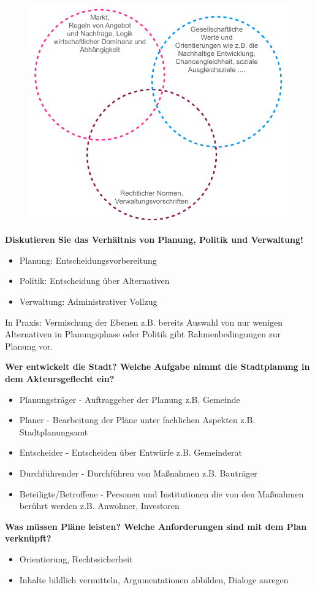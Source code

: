 \documentclass[]{article}
\newenvironment{question}{\vspace{8mm}\noindent\bfseries}{\\}
\begin{document}
\begin{figure}[h!]
	\centering
	\includegraphics[width=0.5\linewidth]{images/planung_wirkgeflecht}
	\label{fig:planungwirkgeflecht}
\end{figure}


\begin{question}
	Diskutieren Sie das Verhältnis von Planung, Politik und Verwaltung!
\end{question}
\begin{itemize}
	\item Planung: Entscheidungsvorbereitung
	\item Politik: Entscheidung über Alternativen
	\item Verwaltung: Administrativer Vollzug
\end{itemize}

In Praxis: Vermischung der Ebenen z.B. bereits Auswahl von nur wenigen Alternativen in Planungsphase oder Politik gibt Rahmenbedingungen zur Planung vor.


\begin{question}
	Wer entwickelt die Stadt? Welche Aufgabe nimmt die Stadtplanung in dem Akteursgeflecht ein?
\end{question}
\begin{itemize}
	\item Planungsträger - Auftraggeber der Planung z.B. Gemeinde
	\item Planer - Bearbeitung der Pläne unter fachlichen Aspekten z.B. Stadtplanungsamt
	\item Entscheider - Entscheiden über Entwürfe z.B. Gemeinderat
	\item Durchführender - Durchführen von Maßnahmen z.B. Bauträger
	\item Beteiligte/Betroffene - Personen und Institutionen die von den Maßnahmen berührt werden z.B. Anwohner, Investoren
\end{itemize}


\begin{question}
	Was müssen Pläne leisten? Welche Anforderungen sind mit dem Plan verknüpft?
\end{question}
\begin{itemize}
	\item Orientierung, Rechtssicherheit
	\item Inhalte bildlich vermitteln, Argumentationen abbilden, Dialoge anregen
\end{itemize}
\end{document}
